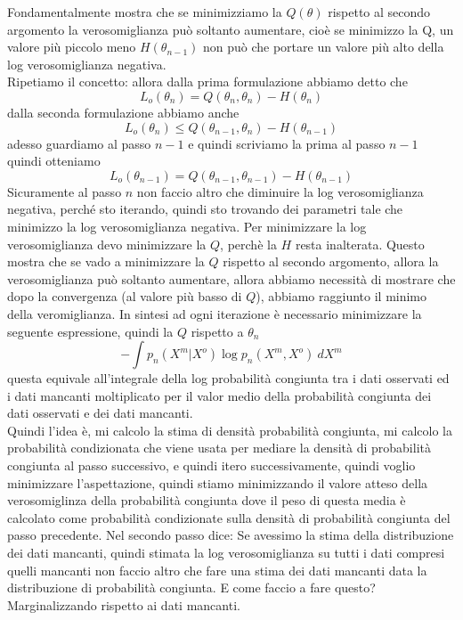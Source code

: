 \noindent Fondamentalmente mostra che se minimizziamo la $Q(\theta)$ rispetto al secondo argomento la verosomiglianza può soltanto aumentare, cioè se minimizzo la Q, un valore più piccolo meno $H(\theta_{n-1})$ non può che portare un valore più alto della log verosomiglianza negativa.\\

\noindent Ripetiamo il concetto: allora dalla prima formulazione abbiamo detto che 
\begin{equation}
L_o (\theta_n) = Q(\theta_{n}, \theta_n) - H(\theta_{n})
\end{equation}
dalla seconda formulazione  abbiamo anche
\begin{equation}
L_o (\theta_n) \leq Q(\theta_{n-1}, \theta_n) - H(\theta_{n-1})
\end{equation}
adesso guardiamo al passo $n-1$ e quindi scriviamo la prima al passo $n-1$ quindi otteniamo
\begin{equation}
L_o (\theta_{n-1}) = Q(\theta_{n-1}, \theta_{n-1}) - H(\theta_{n-1})
\end{equation}
Sicuramente al passo $n$ non faccio altro che diminuire la log verosomiglianza negativa, perché sto iterando, quindi sto trovando dei parametri tale che minimizzo la log verosomiglianza negativa. Per minimizzare la log verosomiglianza devo minimizzare la $Q$, perchè la $H$ resta inalterata. Questo mostra che se vado a minimizzare la $Q$ rispetto al secondo argomento, allora la verosomiglianza può soltanto aumentare, allora abbiamo necessità di mostrare che dopo la convergenza (al valore più basso di $Q$), abbiamo raggiunto il minimo della veromiglianza. In sintesi ad ogni iterazione è necessario minimizzare la seguente espressione,  quindi la $Q$ rispetto a $\theta_n$
\begin{equation}
-\int p_n(X^m|X^o) \log p_n(X^m, X^o) \ dX^m
\end{equation}
questa equivale all'integrale della log probabilità congiunta tra i dati osservati ed i dati mancanti moltiplicato per il valor medio della probabilità congiunta dei dati osservati e dei dati mancanti.\\

\noindent Quindi l'idea è, mi calcolo la stima di densità probabilità congiunta, mi calcolo la probabilità condizionata che viene usata per mediare la densità di probabilità congiunta al passo successivo, e quindi itero successivamente, quindi voglio minimizzare l'aspettazione, quindi stiamo minimizzando il valore atteso della verosomiglinza della probabilità congiunta dove il peso di questa media è calcolato come probabilità condizionate sulla densità di probabilità congiunta del passo precedente. Nel secondo passo dice: Se avessimo la stima della distribuzione dei dati mancanti, quindi stimata la log verosomiglianza su tutti i dati compresi quelli mancanti non faccio altro che fare una stima dei dati mancanti data la distribuzione di probabilità congiunta. E come faccio a fare questo? Marginalizzando rispetto ai dati mancanti.\\

